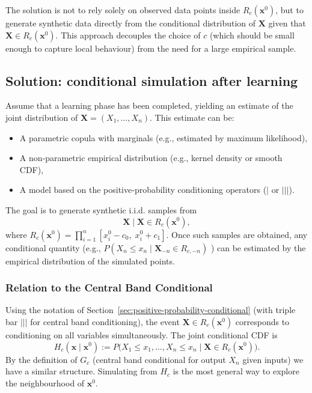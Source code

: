 The solution is not to rely solely on observed data points inside $R_c(\mathbf{x}^0)$, but to generate synthetic data directly from the conditional distribution of $\mathbf{X}$ given that $\mathbf{X} \in R_c(\mathbf{x}^0)$. This approach decouples the choice of $c$ (which should be small enough to capture local behaviour) from the need for a large empirical sample.

\subsection{Solution: conditional simulation after learning}

Assume that a learning phase has been completed, yielding an estimate of the joint distribution of $\mathbf{X} = (X_1,\dots,X_n)$. This estimate can be:
\begin{itemize}
    \item A parametric copula with marginals (e.g., estimated by maximum likelihood),
    \item A non‑parametric empirical distribution (e.g., kernel density or smooth CDF),
    \item A model based on the positive‑probability conditioning operators ($|$ or $|||$).
\end{itemize}

The goal is to generate synthetic i.i.d. samples from
\[
\mathbf{X} \;\big|\; \mathbf{X} \in R_c(\mathbf{x}^0),
\]
where $R_c(\mathbf{x}^0) = \prod_{i=1}^n [x_i^0 - c_0,\; x_i^0 + c_1]$. Once such samples are obtained, any conditional quantity (e.g., $P(X_n \le x_n \mid \mathbf{X}_{-n} \in R_{c,-n})$ ) can be estimated by the empirical distribution of the simulated points.

\subsubsection*{Relation to the Central Band Conditional}

Using the notation of Section~\ref{sec:positive-probability-conditional} (with triple bar $|||$ for central band conditioning), the event $\mathbf{X} \in R_c(\mathbf{x}^0)$ corresponds to conditioning on all variables simultaneously. The joint conditional CDF is
\[
H_c(\mathbf{x} \mid \mathbf{x}^0) := P\bigl( X_1 \le x_1,\dots,X_n \le x_n \;\big|\; \mathbf{X} \in R_c(\mathbf{x}^0) \bigr).
\]
By the definition of $G_c$ (central band conditional for output $X_n$ given inputs) we have a similar structure. Simulating from $H_c$ is the most general way to explore the neighbourhood of $\mathbf{x}^0$.

